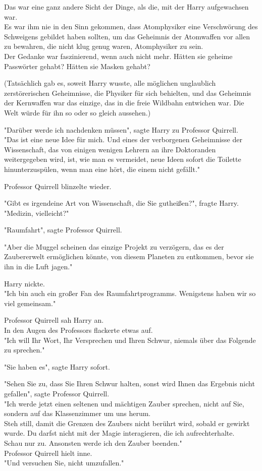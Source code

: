 {Das war eine ganz andere Sicht der Dinge, als die, mit der Harry aufgewachsen war.\\ Es war ihm nie in den Sinn gekommen, dass Atomphysiker eine Verschwörung des Schweigens gebildet haben sollten, um das Geheimnis der Atomwaffen vor allen zu bewahren, die nicht klug genug waren, Atomphysiker zu sein.\\ Der Gedanke war faszinierend, wenn auch nicht mehr. Hätten sie geheime Passwörter gehabt? Hätten sie Masken gehabt?

(Tatsächlich gab es, soweit Harry wusste, alle möglichen unglaublich zerstörerischen Geheimnisse, die Physiker für sich behielten, und das Geheimnis der Kernwaffen war das einzige, das in die freie Wildbahn entwichen war. Die Welt würde für ihn so oder so gleich aussehen.)

"Darüber werde ich nachdenken müssen", sagte Harry zu Professor Quirrell.\\ "Das ist eine neue Idee für mich. Und eines der verborgenen Geheimnisse der Wissenschaft, das von einigen wenigen Lehrern an ihre Doktoranden weitergegeben wird, ist, wie man es vermeidet, neue Ideen sofort die Toilette hinunterzuspülen, wenn man eine hört, die einem nicht gefällt."

Professor Quirrell blinzelte wieder.

"Gibt es irgendeine Art von Wissenschaft, die Sie gutheißen?", fragte Harry.\\ "Medizin, vielleicht?"

"Raumfahrt", sagte Professor Quirrell.

"Aber die Muggel scheinen das einzige Projekt zu verzögern, das es der Zaubererwelt ermöglichen könnte, von diesem Planeten zu entkommen, bevor sie ihn in die Luft jagen."

Harry nickte.\\ "Ich bin auch ein großer Fan des Raumfahrtprogramms. Wenigstens haben wir so viel gemeinsam."

Professor Quirrell sah Harry an.\\ In den Augen des Professors flackerte etwas auf.\\ "Ich will Ihr Wort, Ihr Versprechen und Ihren Schwur, niemals über das Folgende zu sprechen."

"Sie haben es", sagte Harry sofort.

"Sehen Sie zu, dass Sie Ihren Schwur halten, sonst wird Ihnen das Ergebnis nicht gefallen", sagte Professor Quirrell.\\ "Ich werde jetzt einen seltenen und mächtigen Zauber sprechen, nicht auf Sie, sondern auf das Klassenzimmer um uns herum.\\ Steh still, damit die Grenzen des Zaubers nicht berührt wird, sobald er gewirkt wurde. Du darfst nicht mit der Magie interagieren, die ich aufrechterhalte.\\ Schau nur zu. Ansonsten werde ich den Zauber beenden."\\ Professor Quirrell hielt inne.\\ "Und versuchen Sie, nicht umzufallen."

}
